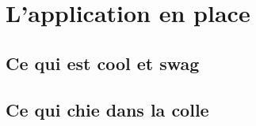
		\section{L'application en place}
			\subsection{Ce qui est cool et swag}
			\subsection{Ce qui chie dans la colle}
	